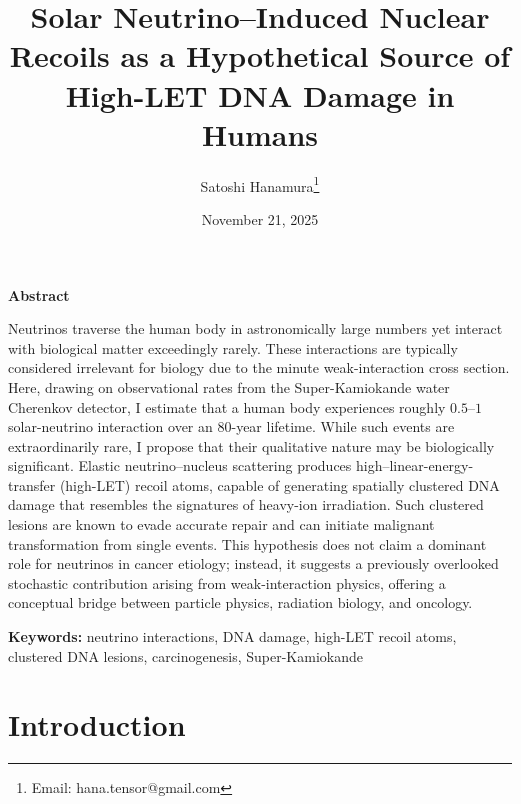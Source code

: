 \documentclass[12pt,a4paper]{article}
\begin{document}
\title{\textbf{Solar Neutrino--Induced Nuclear Recoils as a Hypothetical Source of High-LET DNA Damage in Humans}}

\author{Satoshi Hanamura\thanks{Email: hana.tensor@gmail.com}}
\date{November 21, 2025}

\maketitle
\tableofcontents
\vspace{1cm}

\begin{center}
\textbf{Abstract}
\end{center}

Neutrinos traverse the human body in astronomically large numbers yet interact with biological matter exceedingly rarely. These interactions are typically considered irrelevant for biology due to the minute weak-interaction cross section. Here, drawing on observational rates from the Super-Kamiokande water Cherenkov detector, I estimate that a human body experiences roughly $0.5$--$1$ solar-neutrino interaction over an 80-year lifetime. While such events are extraordinarily rare, I propose that their qualitative nature may be biologically significant. Elastic neutrino--nucleus scattering produces high--linear-energy-transfer (high-LET) recoil atoms, capable of generating spatially clustered DNA damage that resembles the signatures of heavy-ion irradiation. Such clustered lesions are known to evade accurate repair and can initiate malignant transformation from single events. This hypothesis does not claim a dominant role for neutrinos in cancer etiology; instead, it suggests a previously overlooked stochastic contribution arising from weak-interaction physics, offering a conceptual bridge between particle physics, radiation biology, and oncology.

\vspace{0.5cm}
\noindent\textbf{Keywords:} neutrino interactions, DNA damage, high-LET recoil atoms, clustered DNA lesions, carcinogenesis, Super-Kamiokande

\section{Introduction}
\end{document}
